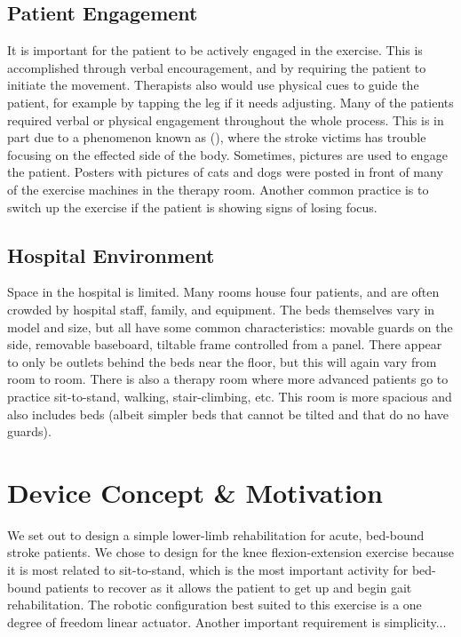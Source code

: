 \documentclass[12pt]{report}
\begin{document}
	\subsection{Patient Engagement} 
	 It is important for the patient to be actively engaged in the exercise. This is accomplished through verbal encouragement, and by requiring the patient to initiate the movement. Therapists also would use physical cues to guide the patient, for example by tapping the leg if it needs adjusting. Many of the patients required verbal or physical engagement throughout the whole process. This is in part due to a phenomenon known as (), where the stroke victims has trouble focusing on the effected side of the body. Sometimes, pictures are used to engage the patient. Posters with pictures of cats and dogs were posted in front of many of the exercise machines in the therapy room. Another common practice is to switch up the exercise if the patient is showing signs of losing focus. 
	 
	 \subsection{Hospital Environment}
	Space in the hospital is limited. Many rooms house four patients, and are often crowded by hospital staff, family, and equipment. The beds themselves vary in model and size, but all have some common characteristics: movable guards on the side, removable baseboard, tiltable frame controlled from a panel. There appear to only be outlets behind the beds near the floor, but this will again vary from room to room. 
	There is also a therapy room where more advanced patients go to practice sit-to-stand, walking, stair-climbing, etc. This room is more spacious and also includes beds (albeit simpler beds that cannot be tilted and that do no have guards). 
	
	\section{Device Concept \& Motivation} 

We set out to design a simple lower-limb rehabilitation for acute, bed-bound stroke patients. We chose to design for the knee flexion-extension exercise because it is most related to sit-to-stand, which is the most important activity for bed-bound patients to recover as it allows the patient to get up and begin gait rehabilitation. The robotic configuration best suited to this exercise is a one degree of freedom linear actuator. 
	Another important requirement is simplicity...	
\end{document}
